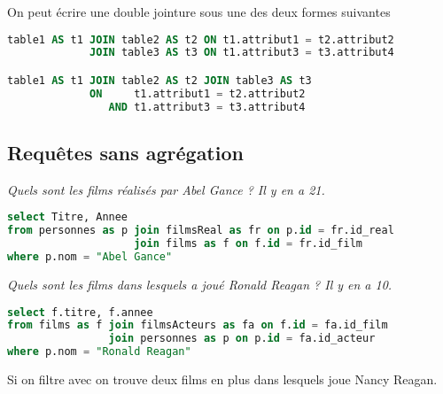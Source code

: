 On peut écrire une double jointure sous une des deux formes suivantes
\begin{lstlisting}[language=SQL]
table1 AS t1 JOIN table2 AS t2 ON t1.attribut1 = t2.attribut2
             JOIN table3 AS t3 ON t1.attribut3 = t3.attribut4

table1 AS t1 JOIN table2 AS t2 JOIN table3 AS t3 
             ON     t1.attribut1 = t2.attribut2 
                AND t1.attribut3 = t3.attribut4
\end{lstlisting}
\subsection{Requêtes sans agrégation}
\begin{Exercise} \it 
Quels sont les films réalisés par Abel Gance ? Il y en a 21.
\end{Exercise}
\begin{Answer}
\begin{lstlisting}[language=SQL]
select Titre, Annee
from personnes as p join filmsReal as fr on p.id = fr.id_real
                    join films as f on f.id = fr.id_film
where p.nom = "Abel Gance"
\end{lstlisting}
\end{Answer}
\begin{Exercise} \it Quels sont les films dans lesquels a joué Ronald Reagan ? Il y en a 10.
\end{Exercise}
\begin{Answer}
\begin{lstlisting}[language=SQL]
select f.titre, f.annee
from films as f join filmsActeurs as fa on f.id = fa.id_film
                join personnes as p on p.id = fa.id_acteur
where p.nom = "Ronald Reagan"
\end{lstlisting}
Si on filtre avec  on trouve deux films en plus dans lesquels joue Nancy Reagan.
\end{Answer}
